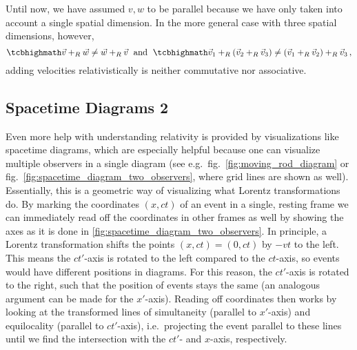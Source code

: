 Until now, we have assumed $v, w$ to be parallel because we have only taken into account a single spatial dimension. In the more general case with three spatial dimensions, however,
\begin{equation}
	\eqbox{
	\vec{v} +_R \vec{w} \neq \vec{w} +_R \vec{v}
	} \; \text{ and } \;
	\eqbox{
	\vec{v}_1 +_R (\vec{v}_2 +_R \vec{v}_3) \neq (\vec{v}_1 +_R \vec{v}_2) +_R \vec{v}_3
	} \, ,
\end{equation}
adding velocities relativistically is neither commutative nor associative.







		\subsection{Spacetime Diagrams 2}
Even more help with understanding relativity is provided by visualizations like spacetime diagrams, which are especially helpful because one can visualize multiple observers in a single diagram (see e.g.~fig.~\ref{fig:moving_rod_diagram} or fig.~\ref{fig:spacetime_diagram_two_observers}, where grid lines are shown as well). Essentially, this is a geometric way of visualizing what Lorentz transformations do. By marking the coordinates $(x, ct)$ of an event in a single, resting frame we can immediately read off the coordinates in other frames as well by showing the axes as it is done in \ref{fig:spacetime_diagram_two_observers}. In principle, a Lorentz transformation shifts the points $(x, ct) = (0, ct)$ by $-vt$ to the left. This means the $ct'$-axis is rotated to the left compared to the $ct$-axis, so events would have different positions in diagrams. For this reason, the $ct'$-axis is rotated to the right, such that the position of events stays the same (an analogous argument can be made for the $x'$-axis). Reading off coordinates then works by looking at the transformed lines of simultaneity (parallel to $x'$-axis) and equilocality (parallel to $ct'$-axis), i.e.~projecting the event parallel to these lines until we find the intersection with the $ct'$- and $x$-axis, respectively.




